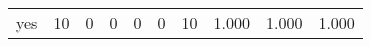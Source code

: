 \begin{longtable}{lp{1.3cm}p{1.3cm}p{1.3cm}p{1.3cm}p{1.3cm}p{1.3cm}p{1.3cm}p{1.3cm}p{1.3cm}}
yes       &                     10 &                                             0 &                                            0 &                                           0 &                                            0 &                                         10 &                                1.000 &                                  1.000 &                                1.000 \\
\end{longtable}
